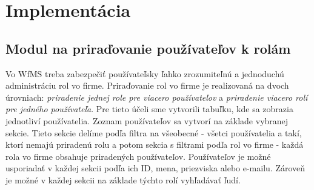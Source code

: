 
\section{Implementácia}

\subsection{Modul na priraďovanie používateľov k rolám}
Vo WfMS treba zabezpečiť používateľsky ľahko zrozumiteľnú a jednoduchú administráciu rol vo firme. Priraďovanie rol vo firme je realizovaná na dvoch úrovniach: \emph{priradenie jednej role pre viacero používateľov} a \emph{priradenie viacero rolí pre jedného používateľa}. Pre tieto účeli sme vytvorili tabuľku, kde sa zobrazia jednotliví používatelia. Zoznam používateľov sa vytvorí na základe vybranej sekcie. Tieto sekcie delíme podľa filtra na všeobecné - všetci používatelia a takí, ktorí nemajú priradenú rolu a potom sekcia s filtrami podľa rol vo firme - každá rola vo firme obsahuje priradených používateľov. Používateľov je možné usporiadať v každej sekcii podľa ich ID, mena, priezviska alebo e-mailu. Zároveň je možné v každej sekcii na základe týchto rolí vyhľadávať ľudí.

